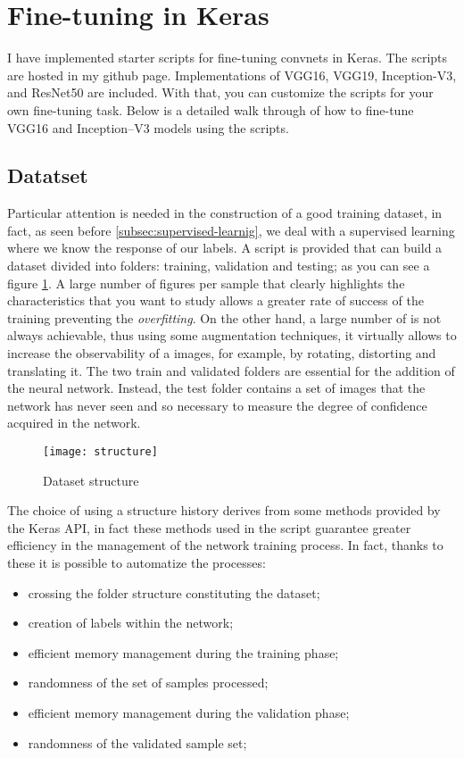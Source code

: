 \section{Fine-tuning in Keras}
\label{sec:finetuningkeras}
%
I have implemented starter scripts for fine-tuning convnets in Keras. 
The scripts are hosted in my github page.
Implementations of VGG16, VGG19, Inception-V3, and ResNet50 are included. 
With that, you can customize the scripts for your own fine-tuning task.
Below is a detailed walk through of how to fine-tune VGG16 and Inception--V3 
models using the scripts.
%
\subsection{Datatset}
\label{subsec:dataset}
Particular attention is needed in the construction of a good training dataset, 
in fact, as seen before \ref{subsec:supervised-learnig}, we deal with a 
supervised learning where we know the response of our labels.
A script is provided that can build a dataset divided into folders: training, 
validation and testing; as you can see a figure \ref{fig:datasetstructure}.
A large number of figures per sample that clearly highlights the characteristics 
that you want to study allows a greater rate of success of the training 
preventing the \emph{overfitting}.
On the other hand, a large number of is not always achievable, thus using some 
augmentation techniques, it virtually allows to increase the observability of a 
images, for example, by rotating, distorting and translating it.
The two train and validated folders are essential for the addition of the 
neural network.
Instead, the test folder contains a set of images that the network has never 
seen and so necessary to measure the degree of confidence acquired in the network.
%
\begin{figure}[htb]
\centering
\texttt{[image: structure]}
\caption{Dataset structure}
\label{fig:datasetstructure}
\end{figure}
%
The choice of using a structure history derives from some methods provided by 
the Keras API, in fact these methods used in the script guarantee greater 
efficiency in the management of the network training process.
In fact, thanks to these it is possible to automatize the processes:
\begin{itemize}
\item crossing the folder structure constituting the dataset;
\item creation of labels within the network;
\item efficient memory management during the training phase;
\item randomness of the set of samples processed;
\item efficient memory management during the validation phase;
\item randomness of the validated sample set;
\end{itemize}
%
